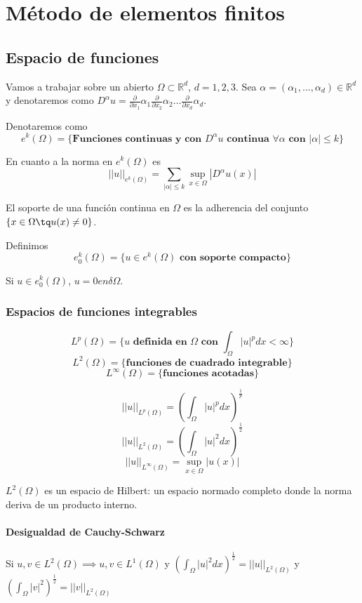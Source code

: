 \newpage
\section{Método de elementos finitos}

\subsection{Espacio de funciones}
Vamos a trabajar sobre un abierto $\Omega\subset\mathbb{R}^d$, $d=1,2,3$.
Sea $\alpha = (\alpha_1,\hdots,\alpha_d)\in\mathbb{R}^d$ y denotaremos como $D^\alpha u=\frac{\partial}{\partial x_1}\alpha_1\frac{\partial}{\partial x_2}\alpha_2\hdots\frac{\partial}{\partial x_d}\alpha_d$.

Denotaremos como 
$$e^k(\Omega) = \{\textbf{Funciones continuas y con } D^\alpha u \textbf{ continua } \forall\alpha\textbf{ con }|\alpha|\le k\}$$

En cuanto a la norma en $e^k(\Omega)$ es
$$||u||_{e^k(\Omega)} = \sum_{|\alpha|\le k}\sup_{x\in\Omega}|D^\alpha u(x)|$$

El soporte de una función continua en $\Omega$ es la adherencia del conjunto $\{x\in\Omega \tq u(x) \neq 0\}$.

Definimos
$$e_0^k (\Omega)= \{u\in e^k(\Omega) \textbf{ con soporte compacto}\}$$

Si $u\in e_0^k(\Omega)$, $u=0 en \delta\Omega$.

\subsubsection{Espacios de funciones integrables}
$$L^p(\Omega) = \{u\textbf{ definida en }\Omega \textbf{ con }\int_\Omega |u|^p dx < \infty \}$$
$$L^2(\Omega)=\{\textbf{funciones de cuadrado integrable}\}$$
$$L^\infty (\Omega) =\{\textbf{funciones acotadas}\}$$

$$||u||_{L^p(\Omega)} = (\int_{\Omega}|u|^p dx)^\frac{1}{p}$$
$$||u||_{L^2(\Omega)} = (\int_{\Omega}|u|^2 dx)^\frac{1}{2}$$
$$||u||_{L^\infty(\Omega)} = \sup_{x\in\Omega}|u(x)|$$

$L^2(\Omega)$ es un espacio de Hilbert: un espacio normado completo donde la norma deriva de un producto interno.

\paragraph{Desigualdad de Cauchy-Schwarz}
Si $u,v\in L^2(\Omega)\implies u,v\in L^1(\Omega)$ y $(\int_\Omega |u|^2dx)^\frac{1}{2} = ||u||_{L^2(\Omega)}$ y $(\int_\Omega|v|^2)^\frac{1}{2} = ||v||_{L^2(\Omega)}$

